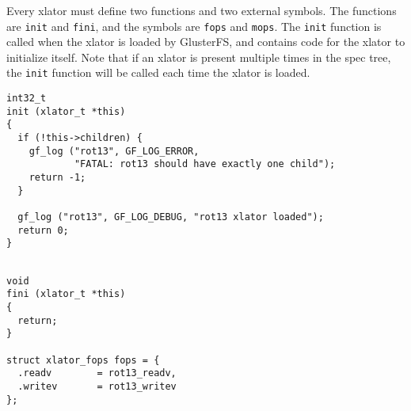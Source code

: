 \documentclass{book}[12pt]
\begin{document}
Every xlator must define two functions and two external symbols. The functions are 
\texttt{init} and \texttt{fini}, and the symbols are \texttt{fops} and \texttt{mops}.
The \texttt{init} function is called when the xlator is loaded by GlusterFS, and 
contains code for the xlator to initialize itself. Note that if an xlator is present
multiple times in the spec tree, the \texttt{init} function will be called each time
the xlator is loaded.

\begin{verbatim}
int32_t
init (xlator_t *this)
{
  if (!this->children) {
    gf_log ("rot13", GF_LOG_ERROR, 
            "FATAL: rot13 should have exactly one child");
    return -1;
  }

  gf_log ("rot13", GF_LOG_DEBUG, "rot13 xlator loaded");
  return 0;
}
\end{verbatim}

\begin{verbatim}

void 
fini (xlator_t *this)
{
  return;
}

struct xlator_fops fops = {
  .readv        = rot13_readv,
  .writev       = rot13_writev
};


\end{verbatim}
\end{document}

